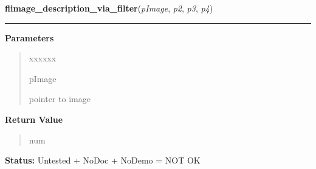 \hspace{.8\funcindent}\begin{boxedminipage}{\funcwidth}

    \raggedright \textbf{flimage\_description\_via\_filter}(\textit{pImage}, \textit{p2}, \textit{p3}, \textit{p4})

    \vspace{-1.5ex}

    \rule{\textwidth}{0.5\fboxrule}
\setlength{\parskip}{2ex}
\setlength{\parskip}{1ex}
      \textbf{Parameters}
      \vspace{-1ex}

      \begin{quote}
        \begin{Ventry}{xxxxxx}

          \item[pImage]

          pointer to image

        \end{Ventry}

      \end{quote}

      \textbf{Return Value}
    \vspace{-1ex}

      \begin{quote}
      num

      \end{quote}

\textbf{Status:} Untested + NoDoc + NoDemo = NOT OK



    \end{boxedminipage}

    \label{xformslib:flflimage:flimage_write_via_filter}

    \vspace{0.5ex}

